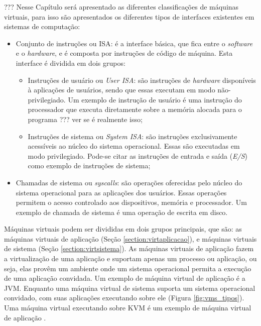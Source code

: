 ??? Nesse Capítulo será apresentado as diferentes classificações de máquinas virtuais, para isso são apresentados os diferentes 
tipos de interfaces existentes em sistemas de computação:
\begin{itemize}
 \item Conjunto de instruções ou \ac{ISA}: é a interface básica, que fica entre o \textit{software} e o \textit{hardware}, e é composta por 
 instruções de código de máquina. Esta interface é dividida em dois grupos:
 \begin{itemize}
  \item Instruções de usuário ou \textit{User \ac{ISA}}: são instruções de \textit{hardware} disponíveis à aplicações de usuários, sendo que 
  essas executam em modo não-privilegiado. Um exemplo de instrução de usuário é uma instrução do processador que executa diretamente sobre a 
  memória alocada para o programa ??? ver se é realmente isso;
  \item Instruções de sistema ou \textit{System \ac{ISA}}: são instruções exclusivamente acessíveis ao núcleo do sistema operacional. 
  Essas são executadas em modo privilegiado. Pode-se citar as instruções de entrada e saída (\textit{E/S}) como exemplo de instruções de sistema;
 \end{itemize}
 \item Chamadas de sistema ou \textit{syscalls}: são operações oferecidas pelo núcleo do sistema operacional para as aplicações dos usuários.
 Essas operações permitem o acesso controlado aos dispositivos, memória e processador. Um exemplo de chamada de sistema é uma operação de escrita 
 em disco.
\end{itemize}

Máquinas virtuais podem ser divididas em dois grupos principais, que são: as máquinas virtuais de aplicação (Seção \ref{section:virtaplicacao}), 
e máquinas virtuais de sistema (Seção \ref{section:virtsistema}). As máquinas virtuais de aplicação fazem a virtualização de uma 
aplicação e suportam apenas um processo ou aplicação, ou seja, elas provêm um ambiente onde um sistema operacional permita a execução de
uma aplicação convidada. Um exemplo de máquina virtual de aplicação é a \ac{JVM}. Enquanto uma máquina virtual de sistema suporta um sistema
operacional convidado, com suas aplicações executando sobre ele (Figura \ref{fig:vms_tipos}). Uma máquina virtual executando sobre \ac{KVM} 
é um exemplo de máquina virtual de aplicação \cite{laureano2008}.

